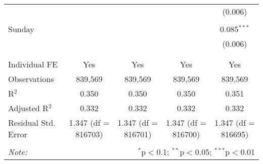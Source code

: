 \documentclass[
]{article}
\begin{document}
\begin{table}[!htbp]
{\begin{tabular}{@{\extracolsep{5pt}}lcccc}
  &  &  &  & (0.006) \\ 
  & & & & \\ 
 Sunday &  &  &  & 0.085$^{***}$ \\ 
  &  &  &  & (0.006) \\ 
  & & & & \\ 
\hline \\[-1.8ex] 
Individual FE & Yes & Yes & Yes & Yes \\ 
Observations & 839,569 & 839,569 & 839,569 & 839,569 \\ 
R$^{2}$ & 0.350 & 0.350 & 0.350 & 0.351 \\ 
Adjusted R$^{2}$ & 0.332 & 0.332 & 0.332 & 0.332 \\ 
Residual Std. Error & 1.347 (df = 816703) & 1.347 (df = 816701) & 1.347 (df = 816700) & 1.347 (df = 816695) \\ 
\hline 
\hline \\[-1.8ex] 
\textit{Note:}  & \multicolumn{4}{r}{$^{*}$p$<$0.1; $^{**}$p$<$0.05; $^{***}$p$<$0.01} \\ 
\end{tabular}
} 
\end{table} 
\newpage
\end{document}
